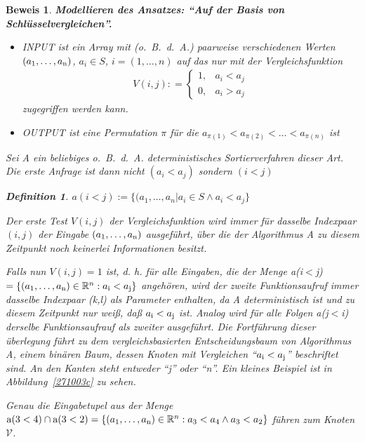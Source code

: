 \documentclass[ngerman,draft,parskip=half*,twoside]{scrreprt}
\theoremstyle{break}
\newtheorem{beweis}{Beweis}
\newtheorem{definition}{Definition}
\begin{document}
\begin{beweis}
\textbf{Modellieren des Ansatzes: "`Auf der Basis von Schlüsselvergleichen"'.}
  \begin{itemize}
  \item INPUT ist ein Array mit (o.~B.~d.~A.) paarweise verschiedenen Werten 
  \( (a_1, \dots , a_{\textup{n}})\), \(a_i \in S\), \(i=(1, \dots, n)\) auf das nur
  mit der Vergleichsfunktion  \begin{gather*} V(i,j) : = \left\lbrace
  \begin{array}{ll} 1, & a_i < a_j \\ 0, & a_i > a_j \end{array} \right.\end{gather*}
  zugegriffen werden kann.
  \item OUTPUT ist eine Permutation \( \pi \) für die \( a_{\pi (1)} < a_{\pi (2)} < \dots < a_{\pi (n)} \) ist 
\end{itemize}

Sei A ein beliebiges o.~B.~d.~A. deterministisches Sortierverfahren dieser Art.
Die erste Anfrage ist dann nicht \( (a_i < a_j) \) sondern \( (i < j) \)

  \begin{definition}
  \(a(i<j) := \lbrace (a_1, \dots , a_n \vert  a_i \in S \wedge a_i < a_j \rbrace \)
  \end{definition}

%
Der erste Test $V(i,j)$ der Vergleichsfunktion wird immer für dasselbe Indexpaar $(i,j)$ der Eingabe \((a_1, \dots , a_{\textup{n}})\)
ausgeführt, über die der Algorithmus A zu diesem Zeitpunkt noch keinerlei Informationen besitzt.

Falls nun $V(i,j)=1$ ist, d. h. für alle Eingaben, die der Menge a(i$<$j)\(=\{(a_1,\ldots,a_{\textup{n}})\in \mathbb{R}^n :
a_{\textup{i}}<a_{\textup{j}}\}\) angehören, wird der zweite Funktionsaufruf immer dasselbe Indexpaar (k,l) als Parameter
enthalten, da A deterministisch ist und zu diesem Zeitpunkt nur weiß, daß \(a_{\textup{i}}<a_{\textup{j}}\) ist. Analog wird für alle
Folgen a(j$<$i) derselbe Funktionsaufrauf als zweiter ausgeführt. Die Fortführung dieser überlegung führt zu dem vergleichsbasierten
Entscheidungsbaum von Algorithmus A, einem binären Baum, dessen Knoten mit Vergleichen "`\(a_{\textup{i}}<a_{\textup{j}}\)"' beschriftet
sind. An den Kanten steht entweder "`j"' oder "`n"'. Ein kleines Beispiel ist in Abbildung~\ref{271003c} zu sehen.

Genau die Eingabetupel aus der Menge \(\textup{a}(3<4)\cap \textup{a}(3<2)=\{(a_1,\ldots,a_{\textup{n}})\in \mathbb{R}^n : a_3<a_4 \wedge
a_3<a_2\}\) führen zum Knoten $\mathcal{V}$. 


\end{beweis}
\end{document}
